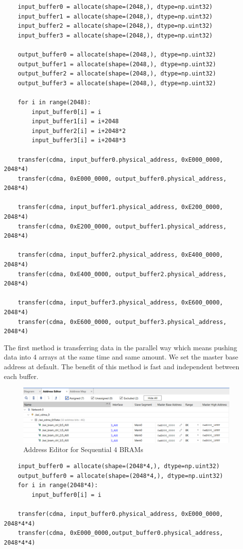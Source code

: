 \documentclass[a4paper, 12pt]{report}
\begin{document}
\begin{lstlisting}
    input_buffer0 = allocate(shape=(2048,), dtype=np.uint32)
    input_buffer1 = allocate(shape=(2048,), dtype=np.uint32)
    input_buffer2 = allocate(shape=(2048,), dtype=np.uint32)
    input_buffer3 = allocate(shape=(2048,), dtype=np.uint32)

    output_buffer0 = allocate(shape=(2048,), dtype=np.uint32)
    output_buffer1 = allocate(shape=(2048,), dtype=np.uint32)
    output_buffer2 = allocate(shape=(2048,), dtype=np.uint32)
    output_buffer3 = allocate(shape=(2048,), dtype=np.uint32)
    
    for i in range(2048):
        input_buffer0[i] = i
        input_buffer1[i] = i+2048
        input_buffer2[i] = i+2048*2
        input_buffer3[i] = i+2048*3

    transfer(cdma, input_buffer0.physical_address, 0xE000_0000, 2048*4)
    transfer(cdma, 0xE000_0000, output_buffer0.physical_address, 2048*4)

    transfer(cdma, input_buffer1.physical_address, 0xE200_0000, 2048*4)
    transfer(cdma, 0xE200_0000, output_buffer1.physical_address, 2048*4)

    transfer(cdma, input_buffer2.physical_address, 0xE400_0000, 2048*4)
    transfer(cdma, 0xE400_0000, output_buffer2.physical_address, 2048*4)

    transfer(cdma, input_buffer3.physical_address, 0xE600_0000, 2048*4)
    transfer(cdma, 0xE600_0000, output_buffer3.physical_address, 2048*4)

\end{lstlisting}

The first method is transferring data in the parallel way which means pushing data into 4 arrays at the same time and same amount. We set the master base address at default. The benefit of this method is fast and independent between each buffer. 
\begin{figure}[H]
    \centering
    \includegraphics[width = 16cm]{picture/dma/Screenshot 2022-12-23 072354.png}
    \caption{Address Editor for Sequential 4 BRAMs}
\end{figure}
\begin{lstlisting}
    input_buffer0 = allocate(shape=(2048*4,), dtype=np.uint32)
    output_buffer0 = allocate(shape=(2048*4,), dtype=np.uint32)
    for i in range(2048*4):
        input_buffer0[i] = i

    transfer(cdma, input_buffer0.physical_address, 0xE000_0000, 2048*4*4)
    transfer(cdma, 0xE000_0000,output_buffer0.physical_address, 2048*4*4)
\end{lstlisting}
\end{document}
